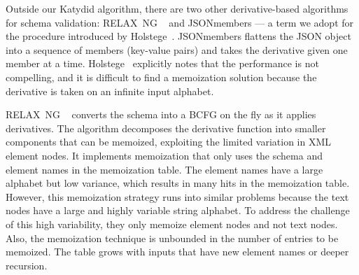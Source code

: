 \documentclass[runningheads]{llncs}
\newcommand{\RelaxNG}{%
  RELAX~NG\xspace%
}
\newcommand{\BCFG}{\ac{BCFG}\xspace}
\newcommand{\JSON}{\ac{JSON}\xspace}
\newcommand{\XML}{\ac{XML}\xspace}
\begin{document}
Outside our Katydid algorithm, there are two other derivative-based algorithms for schema validation: \RelaxNG~\cite{relaxng2001simple} and JSONmembers — a term we adopt for the procedure introduced by Holstege~\cite{holstege2019application}.
JSONmembers flattens the \JSON object into a sequence of members (key-value pairs) and takes the derivative given one member at a time.
Holstege~\cite{holstege2019application} explicitly notes that the performance is not compelling, and it is difficult to find a memoization solution because the derivative is taken on an infinite input alphabet.

\RelaxNG~\cite{relaxng2001simple} converts the schema into a \BCFG on the fly as it applies derivatives.
The algorithm decomposes the derivative function into smaller components that can be memoized, exploiting the limited variation in \XML element nodes.
It implements memoization that only uses the schema and element names in the memoization table.
The element names have a large alphabet but low variance, which results in many hits in the memoization table.
However, this memoization strategy runs into similar problems because the text nodes have a large and highly variable string alphabet.
To address the challenge of this high variability, they only memoize element nodes and not text nodes.
Also, the memoization technique is unbounded in the number of entries to be memoized.
The table grows with inputs that have new element names or deeper recursion.
\end{document}
